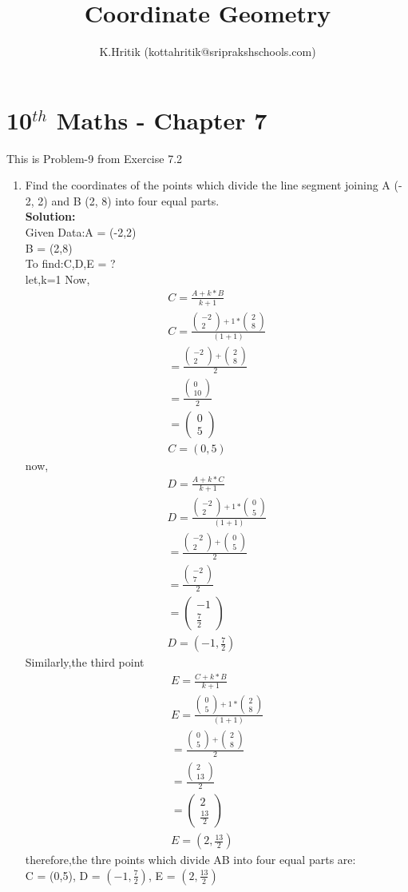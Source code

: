 \documentclass[12pt]{article}
\title{Coordinate Geometry}
\author{K.Hritik (kottahritik@sriprakshschools.com)}
\newcommand{\myvec}[1]{\ensuremath{\begin{pmatrix}#1\end{pmatrix}}}
\newcommand{\solution}{\noindent \textbf{Solution: }}
\begin{document}
\maketitle
\section*{10$^{th}$ Maths - Chapter 7}
This is Problem-9 from Exercise 7.2
\begin{enumerate}
\item Find the coordinates of the points which divide the line segment joining A (- 2, 2) and B (2, 8) into four equal parts.  \\
\solution \\
Given Data:A = (-2,2)\\
           B = (2,8)\\
To find:C,D,E = ?\\
let,k=1
Now, 
\begin{align}
C = \frac{A+k*B}{k+1}\\
C = \frac{\myvec{-2\\2}+1*\myvec{2\\8}}{(1+1)}\\
= \frac{\myvec{-2\\2}+\myvec{2\\8}}{2}\\
= \frac{\myvec{0\\10}}{2}\\
 = \myvec{0\\5}\\
C = (0,5)
\end{align}	
now, 
\begin{align}
D = \frac{A+k*C}{k+1}\\
D = \frac{\myvec{-2\\2}+1*\myvec{0\\5}}{(1+1)}\\
= \frac{\myvec{-2\\2}+\myvec{0\\5}}{2}\\
= \frac{\myvec{-2\\7}}{2}\\
= \myvec{-1\\\frac{7}{2}}\\
D = (-1,\frac{7}{2})
\end{align}
Similarly,the third point 
\begin{align}
E = \frac{C+k*B}{k+1}\\
E = \frac{\myvec{0\\5}+1*\myvec{2\\8}}{(1+1)}\\
= \frac{\myvec{0\\5}+\myvec{2\\8}}{2}\\
= \frac{\myvec{2\\13}}{2}\\
 = \myvec{2\\\frac{13}{2}}\\
E = (2,\frac{13}{2})
\end{align}
therefore,the thre points which divide AB into four equal parts are:\\
C = (0,5),
D = $(-1,\frac{7}{2})$,
E = $(2,\frac{13}{2})$
\end{enumerate}
\end{document}
